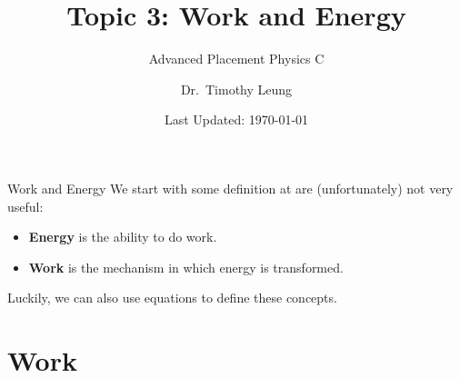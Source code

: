 \documentclass[12pt,compress,aspectratio=169]{beamer}
\title{Topic 3: Work and Energy}
\subtitle{Advanced Placement Physics C}
\author[TML]{Dr.\ Timothy Leung}
\institute{Olympiads School}
\date{Last Updated: \today}
\begin{document}
\begin{frame}
  \maketitle
\end{frame}




\begin{frame}{Work and Energy}
  We start with some definition at are (unfortunately) not very useful:
  \begin{itemize}
    \item \textbf{Energy} is the ability to do work.
    \item \textbf{Work} is the mechanism in which energy is transformed.
  \end{itemize}
  Luckily, we can also use equations to define these concepts.
\end{frame}


\section{Work}
\end{document}
